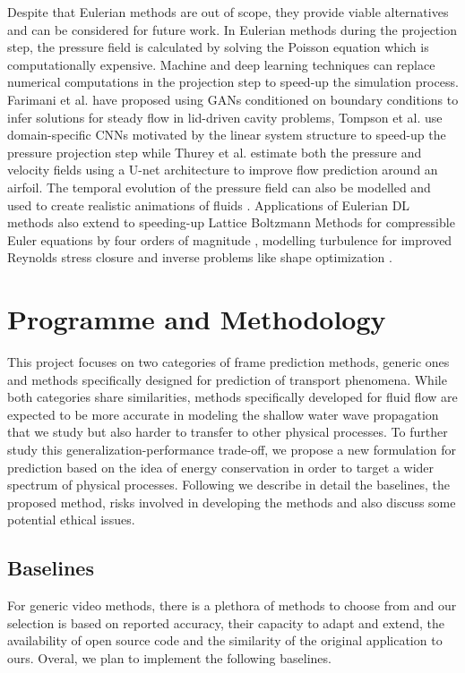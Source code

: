 \documentclass[a4paper,11pt]{article}
\begin{document}
Despite that Eulerian methods are out of scope, they provide viable alternatives and can be considered for future work. In Eulerian methods during the projection step, the pressure field is calculated by solving the Poisson equation which is computationally expensive. Machine and deep learning techniques can replace numerical computations in the projection step to speed-up the simulation process. Farimani et al. \cite{farimani2017deep} have proposed using GANs conditioned on boundary conditions to infer solutions for steady flow in lid-driven cavity problems, Tompson et al. \cite{tompson2017accelerating} use domain-specific CNNs motivated by the linear system structure to speed-up the pressure projection step while Thurey et al. \cite{thuerey2018well} estimate both the pressure and velocity fields using a U-net architecture to improve flow prediction around an airfoil. The temporal evolution of the pressure field can also be modelled and used to create realistic animations of fluids \cite{wiewel2018latent}. Applications of Eulerian DL methods also extend to speeding-up Lattice Boltzmann Methods for compressible Euler equations by four orders of magnitude \cite{guo2016convolutional}, modelling turbulence for improved Reynolds stress closure \cite{ling2016reynolds} and inverse problems like shape optimization \cite{umetani2018learning}.


\section{Programme and Methodology}\label{sec:3methods}

This project focuses on two categories of frame prediction methods, generic ones and methods specifically designed for prediction of transport phenomena. While both categories share similarities, methods specifically developed for fluid flow are expected to be more accurate in modeling the shallow water wave propagation that we study but also harder to transfer to other physical processes. To further study this generalization-performance trade-off, we propose a new formulation for prediction based on the idea of energy conservation in order to target a wider spectrum of physical processes. Following we describe in detail the baselines, the proposed method, risks involved in developing the methods and also discuss some potential ethical issues.

\subsection{Baselines}
\label{sec:3baselines}
For generic video methods, there is a plethora of methods to choose from and our selection is based on reported accuracy, their capacity to adapt and extend, the availability of open source code and the similarity of the original application to ours. Overal, we plan to implement the following baselines.
\end{document}
